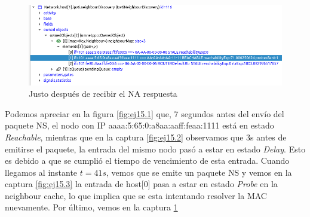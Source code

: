 \begin{figure}[h]
    \centering
    \includegraphics[width=\textwidth]{img/ej15.4.png}
    \caption{Justo después de recibir el NA respuesta }
    \label{fig:ej15.4}
\end{figure}
\begin{flushleft}
    Podemos apreciar en la figura \ref{fig:ej15.1} que, 7 segundos antes del envío del paquete NS, el nodo con IP aaaa:5:65:0:a8aa:aaff:feaa:1111 está en estado \textit{Reachable}, mientras que en la captura \ref{fig:ej15.2} observamos que 3s antes de emitirse el paquete, la entrada del mismo nodo pasó a estar en estado \textit{Delay}. Esto es debido a que se cumplió el tiempo de vencimiento de esta entrada. 
    Cuando llegamos al instante \(t= 41s\), vemos que se emite un paquete NS y vemos en la captura \ref{fig:ej15.3} la entrada de host[0] pasa a estar en estado \textit{Probe} en la neighbour cache, lo que implica que se esta intentando resolver la MAC nuevamente. Por último, vemos en la captura \ref{fig:ej15.4} 
\end{flushleft}
